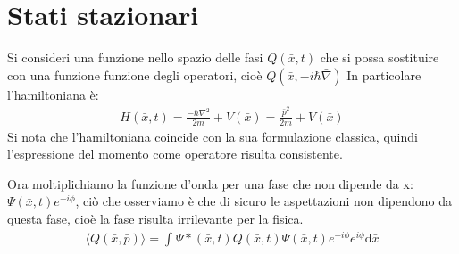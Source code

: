 


\section{Stati stazionari} %
Si consideri una funzione nello spazio delle fasi $Q\left(\bar x,t \right)$ che si possa sostituire con una funzione funzione degli operatori, cioè $Q\left(\bar x,-i\hbar\bar\nabla \right)$
In particolare l'hamiltoniana è:
\begin{equation}\begin{split}
H\left(\bar x,t\right)=\frac{-\hbar\nabla ^2}{2m}+V\left(\bar x\right)=\frac{\bar p^2}{2m}+V\left(\bar x\right)
\end{split}\end{equation}
Si nota che l'hamiltoniana coincide con la sua formulazione classica, quindi l'espressione del momento come operatore risulta consistente.

Ora moltiplichiamo la funzione d'onda per una fase che non dipende da x: $\Psi\left(\bar x,t\right)e^{-i\phi}$, ciò che osserviamo è che di sicuro le aspettazioni non dipendono da questa fase, cioè la fase risulta irrilevante per la fisica.
\begin{equation}\begin{split}
\langle Q\left(\bar x,\bar p \right)\rangle =\int_{}^{}{\Psi*\left(\bar x,t\right)Q\left(\bar x,t \right)\Psi\left(\bar x,t \right)e^{-i\phi}e^{i\phi}\textrm{d}\bar x}
\end{split}\end{equation}

